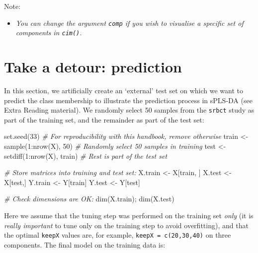 \documentclass[
]{book}
\newenvironment{Shaded}{\begin{snugshade}}{\end{snugshade}}
\newcommand{\CommentTok}[1]{\textcolor[rgb]{0.56,0.35,0.01}{\textit{#1}}}
\newcommand{\DecValTok}[1]{\textcolor[rgb]{0.00,0.00,0.81}{#1}}
\newcommand{\FunctionTok}[1]{\textcolor[rgb]{0.00,0.00,0.00}{#1}}
\newcommand{\NormalTok}[1]{#1}
\newcommand{\OtherTok}[1]{\textcolor[rgb]{0.56,0.35,0.01}{#1}}
\newcommand{\SpecialCharTok}[1]{\textcolor[rgb]{0.00,0.00,0.00}{#1}}
\providecommand{\tightlist}{%
  \setlength{\itemsep}{0pt}\setlength{\parskip}{0pt}}
\begin{document}
Note:

\begin{itemize}
\tightlist
\item
  \emph{You can change the argument \texttt{comp} if you wish to visualise a specific set of components in \texttt{cim()}.}
\end{itemize}

\hypertarget{detour:plsda:predict}{%
\section{Take a detour: prediction}\label{detour:plsda:predict}}

In this section, we artificially create an `external' test set on which we want to predict the class membership to illustrate the prediction process in sPLS-DA (see Extra Reading material). We randomly select 50 samples from the \texttt{srbct} study as part of the training set, and the remainder as part of the test set:

\begin{Shaded}
\begin{Highlighting}[]
\FunctionTok{set.seed}\NormalTok{(}\DecValTok{33}\NormalTok{) }\CommentTok{\# For reproducibility with this handbook, remove otherwise}
\NormalTok{train }\OtherTok{\textless{}{-}} \FunctionTok{sample}\NormalTok{(}\DecValTok{1}\SpecialCharTok{:}\FunctionTok{nrow}\NormalTok{(X), }\DecValTok{50}\NormalTok{)    }\CommentTok{\# Randomly select 50 samples in training}
\NormalTok{test }\OtherTok{\textless{}{-}} \FunctionTok{setdiff}\NormalTok{(}\DecValTok{1}\SpecialCharTok{:}\FunctionTok{nrow}\NormalTok{(X), train) }\CommentTok{\# Rest is part of the test set}

\CommentTok{\# Store matrices into training and test set:}
\NormalTok{X.train }\OtherTok{\textless{}{-}}\NormalTok{ X[train, ]}
\NormalTok{X.test }\OtherTok{\textless{}{-}}\NormalTok{ X[test,]}
\NormalTok{Y.train }\OtherTok{\textless{}{-}}\NormalTok{ Y[train]}
\NormalTok{Y.test }\OtherTok{\textless{}{-}}\NormalTok{ Y[test]}

\CommentTok{\# Check dimensions are OK:}
\FunctionTok{dim}\NormalTok{(X.train); }\FunctionTok{dim}\NormalTok{(X.test)}
\end{Highlighting}
\end{Shaded}

Here we assume that the tuning step was performed on the training set \emph{only} (it is \emph{really important} to tune only on the training step to avoid overfitting), and that the optimal \texttt{keepX} values are, for example, \texttt{keepX\ =\ c(20,30,40)} on three components. The final model on the training data is:
\end{document}
